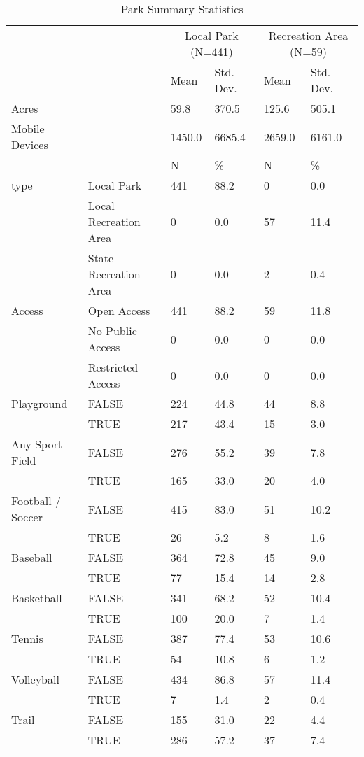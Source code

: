 \documentclass[3p, authoryear]{elsarticle} %
\begin{document}
\begin{table}

\caption{\label{tab:park-attributes}Park Summary Statistics}
\centering
\begin{tabular}[t]{llllll}
\toprule
\multicolumn{2}{c}{ } & \multicolumn{2}{c}{Local Park (N=441)} & \multicolumn{2}{c}{Recreation Area (N=59)} \\
\cmidrule(l{3pt}r{3pt}){3-4} \cmidrule(l{3pt}r{3pt}){5-6}
  &    & Mean & Std. Dev. & Mean  & Std. Dev. \\
\midrule
Acres &  & 59.8 & 370.5 & 125.6 & 505.1\\
Mobile Devices &  & 1450.0 & 6685.4 & 2659.0 & 6161.0\\
\midrule
 &  & N & \% & N & \%\\
type & Local Park & 441 & 88.2 & 0 & 0.0\\
 & Local Recreation Area & 0 & 0.0 & 57 & 11.4\\
 & State Recreation Area & 0 & 0.0 & 2 & 0.4\\
Access & Open Access & 441 & 88.2 & 59 & 11.8\\
 & No Public Access & 0 & 0.0 & 0 & 0.0\\
 & Restricted Access & 0 & 0.0 & 0 & 0.0\\
Playground & FALSE & 224 & 44.8 & 44 & 8.8\\
 & TRUE & 217 & 43.4 & 15 & 3.0\\
Any Sport Field & FALSE & 276 & 55.2 & 39 & 7.8\\
 & TRUE & 165 & 33.0 & 20 & 4.0\\
Football / Soccer & FALSE & 415 & 83.0 & 51 & 10.2\\
 & TRUE & 26 & 5.2 & 8 & 1.6\\
Baseball & FALSE & 364 & 72.8 & 45 & 9.0\\
 & TRUE & 77 & 15.4 & 14 & 2.8\\
Basketball & FALSE & 341 & 68.2 & 52 & 10.4\\
 & TRUE & 100 & 20.0 & 7 & 1.4\\
Tennis & FALSE & 387 & 77.4 & 53 & 10.6\\
 & TRUE & 54 & 10.8 & 6 & 1.2\\
Volleyball & FALSE & 434 & 86.8 & 57 & 11.4\\
 & TRUE & 7 & 1.4 & 2 & 0.4\\
Trail & FALSE & 155 & 31.0 & 22 & 4.4\\
 & TRUE & 286 & 57.2 & 37 & 7.4\\
\bottomrule
\end{tabular}
\end{table}
\end{document}
